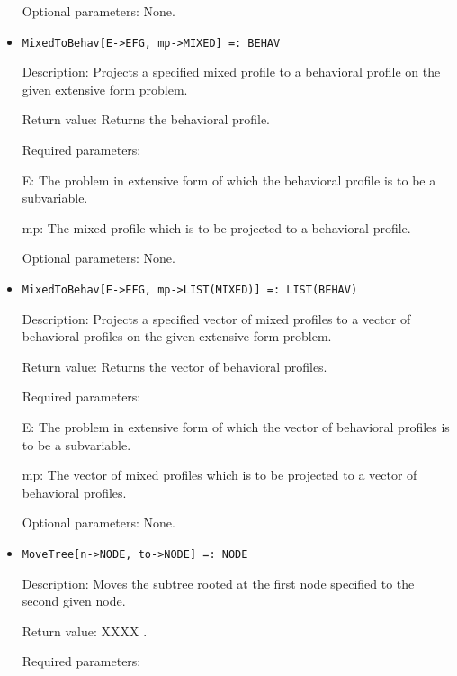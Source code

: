 \begin{itemize}
\item
[Optional parameters:] None.
\ed

\item
\protect \large \begin{verbatim}
MixedToBehav[E->EFG, mp->MIXED] =: BEHAV
\end{verbatim}\normalsize

\bd
\item
[Description:] Projects a specified mixed profile to a behavioral
profile on the given extensive form problem.
\item
[Return value:] Returns the behavioral profile.
\item
[Required parameters:]\hfil\null

\bd
\item
[E:] The problem in extensive form of which the behavioral profile is
to be a subvariable.
\item
[mp:] The mixed profile which is to be projected to a behavioral
profile.
\ed

\item
[Optional parameters:] None.
\ed

\item
\protect \large \begin{verbatim}
MixedToBehav[E->EFG, mp->LIST(MIXED)] =: LIST(BEHAV)
\end{verbatim}\normalsize

\bd
\item
[Description:] Projects a specified vector of mixed profiles to a
vector of behavioral profiles on the given extensive form problem.
\item
[Return value:] Returns the vector of behavioral profiles.
\item
[Required parameters:]\hfil\null

\bd
\item
[E:] The problem in extensive form of which the vector of behavioral
profiles is to be a subvariable.
\item
[mp:] The vector of mixed profiles which is to be projected to a
vector of behavioral profiles.
\ed

\item
[Optional parameters:] None.
\ed

\item
\protect \large \begin{verbatim}
MoveTree[n->NODE, to->NODE] =: NODE
\end{verbatim}\normalsize

\bd
\item
[Description:] Moves the subtree rooted at the first node specified to
the second given node.
\item
[Return value:] XXXX .
\item
[Required parameters:]\hfil\null
	  

\end{itemize}
